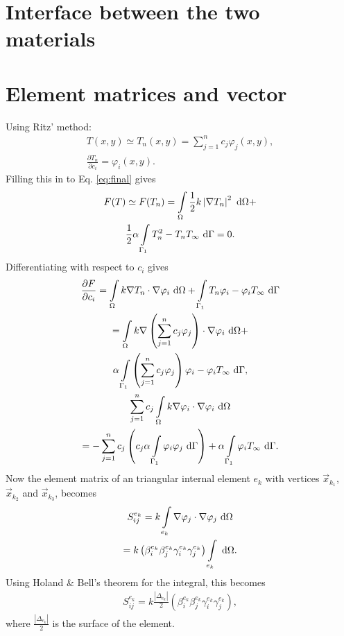 \section{Interface between the two materials} 
\section{Element matrices and vector}
Using Ritz' method: 
\begin{gather*}
    T(x,y) \simeq T_n(x,y)=\sum_{j=1}^n c_j\varphi_j(x,y),\\
    \frac{\partial T_n}{\partial c_i}=\varphi_i(x,y).
\end{gather*} Filling this in to Eq. \ref{eq:final} gives
\begin{gather*}
    F(T)\simeq F(T_n) = \int\displaylimits_{\Omega}\frac{1}{2} k \left|\nabla T_n\right|^2~\mathrm{d}\Omega + \\ \frac{1}{2}\alpha\int\displaylimits_{\Gamma_1}T_n^2-T_nT_{\infty}~\mathrm{d}\Gamma = 0.
\end{gather*} Differentiating with respect to $c_i$ gives
\begin{gather*}
    \frac{\partial F}{\partial c_i} = \int\displaylimits_{\Omega}k\nabla T_n\cdot\nabla\varphi_i~\mathrm{d}\Omega    +\int\displaylimits_{\Gamma_1}T_n\varphi_i-\varphi_iT_{\infty}~\mathrm{d}\Gamma\\
    = \int\displaylimits_{\Omega}k\nabla\left(\sum_{j=1}^n c_j \varphi_j\right)\cdot \nabla \varphi_i~\mathrm{d}\Omega + \\ \alpha\int\displaylimits_{\Gamma_1} \left(\sum_{j=1}^n c_j \varphi_j\right)\varphi_i - \varphi_i T_{\infty}~\mathrm{d}\Gamma,\\
    \sum_{j=1}^n c_j \int\displaylimits_{\Omega}k\nabla\varphi_i\cdot \nabla \varphi_i~\mathrm{d}\Omega \\
    = - \sum_{j=1}^n c_j\left(c_j\alpha\int\displaylimits_{\Gamma_1} \varphi_i \varphi_j~\mathrm{d}\Gamma \right)+\alpha\int\displaylimits_{\Gamma_1}\varphi_i T_{\infty}~\mathrm{d}\Gamma.
\end{gather*} Now the element matrix of an triangular internal element $e_k$ with vertices $\vec{x}_{k_1}$, $\vec{x}_{k_2}$ and $\vec{x}_{k_3}$, becomes
\begin{gather*}
    S_{ij}^{e_k} =  k\int\displaylimits_{e_k} \nabla \varphi_j \cdot \nabla \varphi_j~\mathrm{d}\Omega \\
    = k\left(\beta_i^{e_k} \beta_j^{e_k} \gamma_i^{e_k} \gamma_j^{e_k} \right)\int\displaylimits_{e_k}~\mathrm{d}\Omega.
\end{gather*} Using Holand \& Bell's theorem for the integral, this becomes
\begin{gather}
    S_{ij}^{e_k} = k \frac{|\Delta_{e_k}|}{2}\left(\beta_i^{e_k} \beta_j^{e_k} \gamma_i^{e_k} \gamma_j^{e_k} \right),
\end{gather} where $\frac{|\Delta_{e_k}|}{2}$ is the surface of the element.

